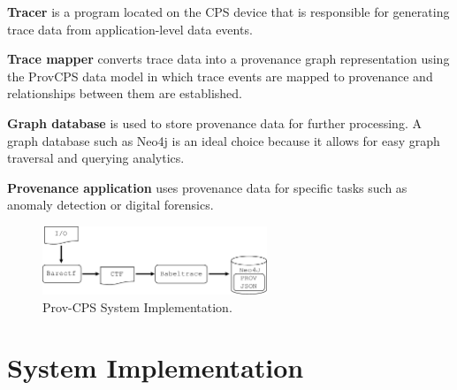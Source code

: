  
 \textbf{Tracer} is a program located on the CPS device that is responsible for generating trace data from application-level data events. 
  
 \textbf{Trace mapper} converts trace data into a provenance graph representation using the ProvCPS data model in which trace events are mapped to provenance and relationships between them are established.
 
 \textbf{Graph database} is used to store provenance data for further processing. A graph database such as Neo4j is an ideal choice because it allows for easy graph traversal and querying analytics.
 
 \textbf{Provenance application} uses provenance data for specific tasks such as anomaly detection or digital forensics. %
 

 \begin{figure}[h!]
\begin{center}
\includegraphics[width=0.6\textwidth]{system_implementation_v4.pdf}
\end{center}
\caption{Prov-CPS System Implementation.}
\label{figure}
\end{figure}

\section{System Implementation} \label{system_implementation}


